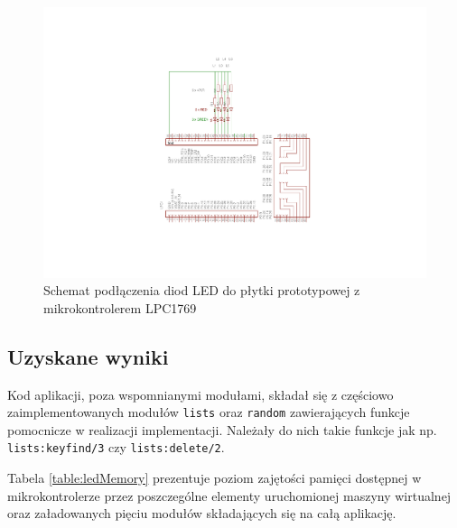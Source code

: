 \begin{figure}[h]
\centerline{\includegraphics[scale=1, clip, trim=0mm 40mm 0mm 35mm]{example_led}}
\caption{Schemat podłączenia diod LED do płytki prototypowej z mikrokontrolerem LPC1769}
\label{fig:exampleled}
\end{figure}


\subsection{Uzyskane wyniki}

Kod aplikacji, poza wspomnianymi modułami, składał się z częściowo zaimplementowanych modułów \texttt{lists} oraz \texttt{random} zawierających funkcje pomocnicze w realizacji implementacji.
Należały do nich takie funkcje jak np. \texttt{lists:keyfind/3} czy \texttt{lists:delete/2}.

Tabela \ref{table:ledMemory} prezentuje poziom zajętości pamięci dostępnej w mikrokontrolerze przez poszczególne elementy uruchomionej maszyny wirtualnej oraz załadowanych pięciu modułów składających się na całą aplikację.

